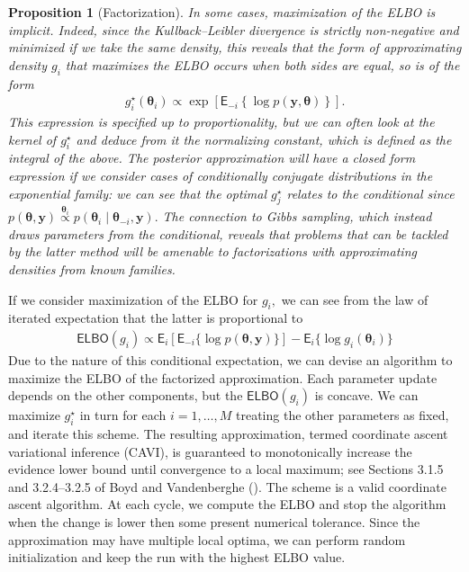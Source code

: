 \documentclass[
  11pt,
  letterpaper,
]{scrbook}
\theoremstyle{definition}
\theoremstyle{plain}
\newtheorem{proposition}{Proposition}[chapter]
\theoremstyle{plain}
\theoremstyle{plain}
\theoremstyle{definition}
\theoremstyle{definition}
\theoremstyle{plain}
\newtheorem{proposition}{Proposition}[chapter]
\theoremstyle{plain}
\theoremstyle{remark}
\begin{document}
\begin{proposition}[Factorization]
In some cases, maximization of the ELBO is implicit. Indeed, since the
Kullback--Leibler divergence is strictly non-negative and minimized if
we take the same density, this reveals that the form of approximating
density \(g_i\) that maximizes the ELBO occurs when both sides are
equal, so is of the form \begin{align*}
 g^{\star}_i(\boldsymbol{\theta}_i) \propto \exp \left[ \mathsf{E}_{-i}\left\{\log p(\boldsymbol{y}, \boldsymbol{\theta})\right\}\right].
\end{align*} This expression is specified up to proportionality, but we
can often look at the kernel of \(g^{\star}_i\) and deduce from it the
normalizing constant, which is defined as the integral of the above. The
posterior approximation will have a closed form expression if we
consider cases of conditionally conjugate distributions in the
exponential family: we can see that the optimal \(g^{\star}_j\) relates
to the conditional since
\(p(\boldsymbol{\theta}, \boldsymbol{y}) \stackrel{\boldsymbol{\theta}_i}{\propto} p(\boldsymbol{\theta}_i \mid \boldsymbol{\theta}_{-i}, \boldsymbol{y}).\)
The connection to Gibbs sampling, which instead draws parameters from
the conditional, reveals that problems that can be tackled by the latter
method will be amenable to factorizations with approximating densities
from known families.

\end{proposition}

If we consider maximization of the ELBO for \(g_i,\) we can see from the
law of iterated expectation that the latter is proportional to
\begin{align*}
 \mathsf{ELBO}(g_i) \propto \mathsf{E}_i \left[ \mathsf{E}_{-i} \{\log p(\boldsymbol{\theta}, \boldsymbol{y}) \}\right] - \mathsf{E}_i\{\log g_i(\boldsymbol{\theta}_i)\}
\end{align*} Due to the nature of this conditional expectation, we can
devise an algorithm to maximize the ELBO of the factorized
approximation. Each parameter update depends on the other components,
but the \(\mathsf{ELBO}(g_i)\) is concave. We can maximize
\(g^{\star}_i\) in turn for each \(i=1, \ldots, M\) treating the other
parameters as fixed, and iterate this scheme. The resulting
approximation, termed coordinate ascent variational inference (CAVI), is
guaranteed to monotonically increase the evidence lower bound until
convergence to a local maximum; see Sections 3.1.5 and 3.2.4--3.2.5 of
Boyd and Vandenberghe (). The
scheme is a valid coordinate ascent algorithm. At each cycle, we compute
the ELBO and stop the algorithm when the change is lower then some
present numerical tolerance. Since the approximation may have multiple
local optima, we can perform random initialization and keep the run with
the highest ELBO value.
\end{document}
